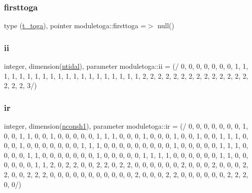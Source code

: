\mbox{\label{namespacemoduletoga_affe7bb283aa5a25e766ceedfd0cfe3bd}} 
\subsubsection{\texorpdfstring{firsttoga}{firsttoga}}
{\footnotesize\ttfamily type (\mbox{\hyperlink{structmoduletoga_1_1t__toga}{t\+\_\+toga}}), pointer moduletoga\+::firsttoga =$>$ null()\hspace{0.3cm}{\ttfamily [private]}}

\mbox{\label{namespacemoduletoga_a0218336e96a9b01a78de8d432ce819a2}} 
\subsubsection{\texorpdfstring{ii}{ii}}
{\footnotesize\ttfamily integer, dimension(\mbox{\hyperlink{namespacemoduletoga_ae4b0b997b6803ae8647fdd97f2dda666}{ntidal}}), parameter moduletoga\+::ii = (/ 0, 0, 0, 0, 0, 0, 0, 1, 1, 1, 1, 1, 1, 1, 1, 1, 1, 1, 1, 1, 1, 1, 1, 1, 1, 1, 1, 2, 2, 2, 2, 2, 2, 2, 2, 2, 2, 2, 2, 2, 2, 2, 2, 2, 3/)\hspace{0.3cm}{\ttfamily [private]}}

\mbox{\label{namespacemoduletoga_afa96c8025ac7806e5ab335cfa4132597}} 
\subsubsection{\texorpdfstring{ir}{ir}}
{\footnotesize\ttfamily integer, dimension(\mbox{\hyperlink{namespacemoduletoga_a06e41646ba24c11ab2e1b513e5c1760c}{nconsh1}}), parameter moduletoga\+::ir = (/ 0, 0, 0, 0, 0, 0, 0, 1, 0, 0, 1, 1, 0, 0, 1, 0, 0, 0, 0, 0, 1, 1, 1, 0, 0, 0, 1, 0, 0, 0, 1, 0, 0, 1, 0, 0, 1, 1, 1, 0, 0, 0, 1, 0, 0, 0, 0, 0, 0, 0, 1, 1, 1, 0, 0, 0, 0, 0, 0, 0, 0, 0, 1, 0, 0, 0, 0, 0, 1, 1, 1, 0, 0, 0, 0, 1, 1, 0, 0, 0, 0, 0, 0, 0, 1, 0, 0, 0, 0, 0, 1, 1, 1, 1, 0, 0, 0, 0, 0, 0, 1, 1, 0, 0, 0, 0, 0, 0, 1, 1, 2, 0, 2, 2, 0, 0, 2, 2, 0, 2, 2, 0, 0, 0, 0, 0, 0, 2, 0, 0, 0, 2, 0, 0, 0, 2, 2, 0, 0, 2, 2, 2, 0, 0, 0, 0, 0, 0, 0, 0, 0, 0, 0, 2, 0, 0, 0, 2, 2, 0, 0, 0, 0, 0, 0, 2, 2, 2, 0, 0/)\hspace{0.3cm}{\ttfamily [private]}}

